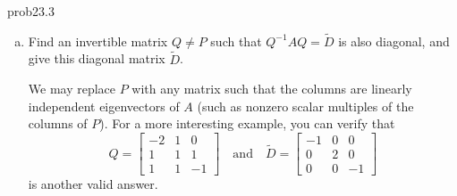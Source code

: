 \begin{sol}{prob23.3}
\begin{enumerate}[a)]
\item Find an invertible  matrix 
$Q \not=P$ such that $Q^{-1}AQ=\tilde D$ is also diagonal,  and give this diagonal matrix $\tilde D$.

\soln We may replace $P$ with any matrix such that the columns are linearly independent eigenvectors of $A$ (such as nonzero scalar multiples of the columns of $P$).  For a more interesting example, you can verify that
$$
Q=\begin{bmatrix} 
-2 & 1 & 0 \\ 
1 & 1 & 1\\ 
1 & 1 & - 1\end{bmatrix}
\quad \text{and} \quad 
\tilde D = \begin{bmatrix} -1 & 0 & 0 \\ 0 & 2 & 0 \\ 0 & 0 & -1 \end{bmatrix}
$$
is another valid answer.

\end{enumerate}
  

\end{sol}